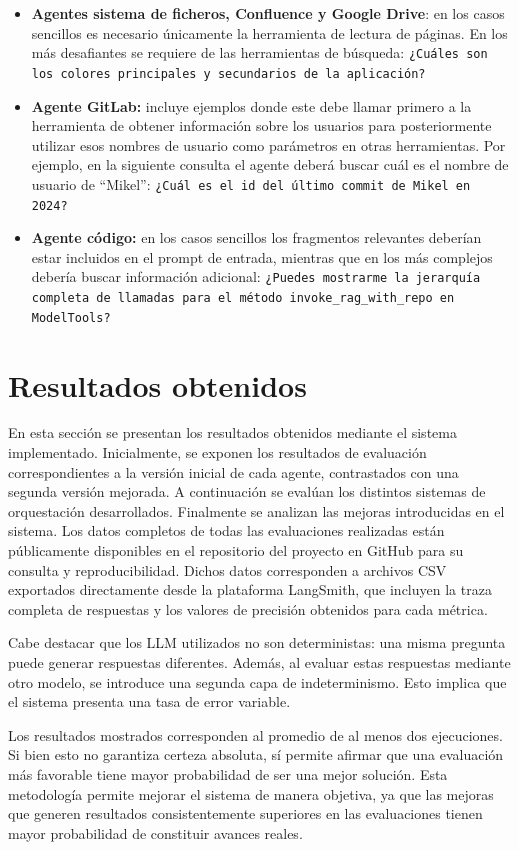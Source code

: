 \begin{itemize}
\begin{itemize}
\end{itemize}
\item\textbf{Agentes sistema de ficheros, Confluence y Google Drive}: en los casos sencillos es necesario únicamente la herramienta de lectura de páginas. En los más desafiantes se requiere de las herramientas de búsqueda: \texttt{¿Cuáles son los colores principales y secundarios de la aplicación?}
\item\textbf{Agente GitLab: }incluye ejemplos donde este debe llamar primero a la herramienta de obtener información sobre los usuarios para posteriormente utilizar esos nombres de usuario como parámetros en otras herramientas. Por ejemplo, en la siguiente consulta el agente deberá buscar cuál es el nombre de usuario de ``Mikel'': \texttt{¿Cuál es el id del último commit de Mikel en 2024?}
\item\textbf{Agente código: }en los casos sencillos los fragmentos relevantes deberían estar incluidos en el prompt de entrada, mientras que en los más complejos debería buscar información adicional: \texttt{¿Puedes mostrarme la jerarquía completa de llamadas para el método invoke\_rag\_with\_repo en ModelTools?}
\end{itemize}

\section{Resultados obtenidos}
En esta sección se presentan los resultados obtenidos mediante el sistema implementado. Inicialmente, se exponen los resultados de evaluación correspondientes a la versión inicial de cada agente, contrastados con una segunda versión mejorada. A continuación se evalúan los distintos sistemas de orquestación desarrollados. Finalmente se analizan las mejoras introducidas en el sistema. Los datos completos de todas las evaluaciones realizadas están públicamente disponibles en el repositorio del proyecto en GitHub para su consulta y reproducibilidad. Dichos datos corresponden a archivos CSV exportados directamente desde la plataforma LangSmith, que incluyen la traza completa de respuestas y los valores de precisión obtenidos para cada métrica.

Cabe destacar que los LLM utilizados no son deterministas: una misma pregunta puede generar respuestas diferentes. Además, al evaluar estas respuestas mediante otro modelo, se introduce una segunda capa de indeterminismo. Esto implica que el sistema presenta una tasa de error variable.

Los resultados mostrados corresponden al promedio de al menos dos ejecuciones. Si bien esto no garantiza certeza absoluta, sí permite afirmar que una evaluación más favorable tiene mayor probabilidad de ser una mejor solución. Esta metodología permite mejorar el sistema de manera objetiva, ya que las mejoras que generen resultados consistentemente superiores en las evaluaciones tienen mayor probabilidad de constituir avances reales.

